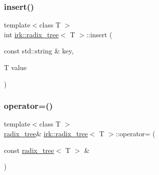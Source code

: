 \mbox{\label{classirk_1_1radix__tree_ad65f1ba2c32c59c3b6fd2ca220a9fc7f}} 
\subsubsection{\texorpdfstring{insert()}{insert()}}
{\footnotesize\ttfamily template$<$class T $>$ \\
int \mbox{\hyperlink{classirk_1_1radix__tree}{irk\+::radix\+\_\+tree}}$<$ T $>$\+::insert (\begin{DoxyParamCaption}\item[{const std\+::string \&}]{key,  }\item[{T}]{value }\end{DoxyParamCaption})\hspace{0.3cm}{\ttfamily [inline]}}

\mbox{\label{classirk_1_1radix__tree_af052f00aa9f6f7ec58648365e28e30c8}} 
\subsubsection{\texorpdfstring{operator=()}{operator=()}\hspace{0.1cm}{\footnotesize\ttfamily [1/2]}}
{\footnotesize\ttfamily template$<$class T $>$ \\
\mbox{\hyperlink{classirk_1_1radix__tree}{radix\+\_\+tree}}\& \mbox{\hyperlink{classirk_1_1radix__tree}{irk\+::radix\+\_\+tree}}$<$ T $>$\+::operator= (\begin{DoxyParamCaption}\item[{const \mbox{\hyperlink{classirk_1_1radix__tree}{radix\+\_\+tree}}$<$ T $>$ \&}]{ }\end{DoxyParamCaption})\hspace{0.3cm}{\ttfamily [delete]}}

\mbox{\label{classirk_1_1radix__tree_a1b4f69f1e02478fe7b8a7dd590fef350}} 
